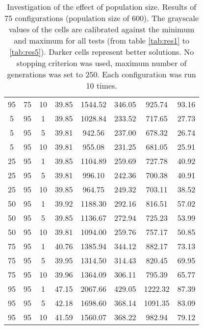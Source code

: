 \begin{table}[h]
\begin{tabular}{ccc|c|c|c|c|c}
95 & 75 & 10 & \cellcolor{gray!50}39.85 & \cellcolor{gray!1}1544.52 & \cellcolor{gray!1}346.05 & \cellcolor{gray!1}925.74 & 93.16\\
5 & 95 & 1 & \cellcolor{gray!50}39.85 & \cellcolor{gray!1}1028.84 & \cellcolor{gray!1}233.52 & \cellcolor{gray!33}717.65 & 27.73\\
5 & 95 & 5 & \cellcolor{gray!50}39.81 & \cellcolor{gray!14}942.56 & \cellcolor{gray!1}237.00 & \cellcolor{gray!45}678.32 & 26.74\\
5 & 95 & 10 & \cellcolor{gray!50}39.81 & \cellcolor{gray!12}955.08 & \cellcolor{gray!1}231.25 & \cellcolor{gray!44}681.05 & 25.91\\
25 & 95 & 1 & \cellcolor{gray!50}39.85 & \cellcolor{gray!1}1104.89 & \cellcolor{gray!1}259.69 & \cellcolor{gray!30}727.78 & 40.92\\
25 & 95 & 5 & \cellcolor{gray!50}39.81 & \cellcolor{gray!5}996.10 & \cellcolor{gray!1}242.36 & \cellcolor{gray!38}700.38 & 40.91\\
25 & 95 & 10 & \cellcolor{gray!50}39.85 & \cellcolor{gray!11}964.75 & \cellcolor{gray!1}249.32 & \cellcolor{gray!37}703.11 & 38.52\\
50 & 95 & 1 & \cellcolor{gray!49}39.92 & \cellcolor{gray!1}1188.30 & \cellcolor{gray!1}292.16 & \cellcolor{gray!2}816.51 & 57.02\\
50 & 95 & 5 & \cellcolor{gray!50}39.85 & \cellcolor{gray!1}1136.67 & \cellcolor{gray!1}272.94 & \cellcolor{gray!30}725.23 & 53.99\\
50 & 95 & 10 & \cellcolor{gray!50}39.81 & \cellcolor{gray!1}1094.00 & \cellcolor{gray!1}259.76 & \cellcolor{gray!21}757.17 & 50.85\\
75 & 95 & 1 & \cellcolor{gray!41}40.76 & \cellcolor{gray!1}1385.94 & \cellcolor{gray!1}344.12 & \cellcolor{gray!1}882.17 & 73.13\\
75 & 95 & 5 & \cellcolor{gray!49}39.95 & \cellcolor{gray!1}1314.50 & \cellcolor{gray!1}314.43 & \cellcolor{gray!1}820.45 & 69.95\\
75 & 95 & 10 & \cellcolor{gray!49}39.96 & \cellcolor{gray!1}1364.09 & \cellcolor{gray!1}306.11 & \cellcolor{gray!9}795.39 & 65.77\\
95 & 95 & 1 & \cellcolor{gray!1}47.15 & \cellcolor{gray!1}2067.66 & \cellcolor{gray!1}429.05 & \cellcolor{gray!1}1222.32 & 87.39\\
95 & 95 & 5 & \cellcolor{gray!26}42.18 & \cellcolor{gray!1}1698.60 & \cellcolor{gray!1}368.14 & \cellcolor{gray!1}1091.35 & 83.09\\
95 & 95 & 10 & \cellcolor{gray!33}41.59 & \cellcolor{gray!1}1560.07 & \cellcolor{gray!1}368.22 & \cellcolor{gray!1}982.94 & 79.12
\end{tabular}
\caption{Investigation of the effect of population size. Results of 75 configurations (population size of 600). The grayscale values of the cells are calibrated against the minimum and maximum for all tests (from table \ref{tab:res1} to \ref{tab:res5}). Darker cells represent better solutions. No stopping criterion was used, maximum number of generations was set to 250. Each configuration was run 10 times.}
\label{tab:res3}
\end{table}

